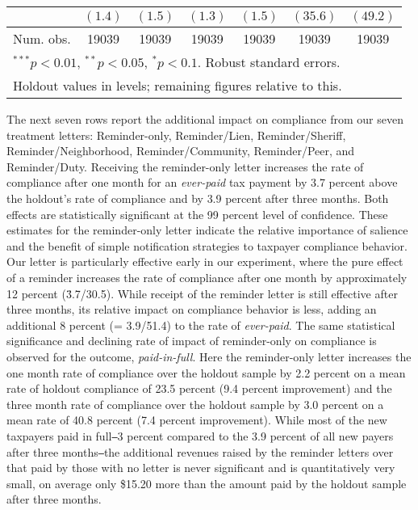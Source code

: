 \documentclass[12pt]{article}
\begin{document}
\begin{table}[htbp]
\begin{center}
\begin{tabular}{l c c c c c c }
             & $(1.4)$      & $(1.5)$      & $(1.3)$      & $(1.5)$      & $(35.6)$      & $(49.2)$      \\
\hline
Num. obs.    & 19039        & 19039        & 19039        & 19039        & 19039         & 19039         \\
\hline
\multicolumn{7}{l}{\scriptsize{$^{***}p<0.01$, $^{**}p<0.05$, $^*p<0.1$. Robust standard errors.}}  \\
\multicolumn{7}{l}{\scriptsize{Holdout values in levels; remaining figures relative to this.}}
\end{tabular}
\label{sh_lin}
\end{center}
\end{table}

The next seven rows report the additional impact on compliance from
our seven treatment letters: Reminder-only, Reminder/Lien,
Reminder/Sheriff, Reminder/Neighborhood, Reminder/Community,
Reminder/Peer, and Reminder/Duty.  Receiving the reminder-only letter
increases the rate of compliance after one month for an
\textit{ever-paid} tax payment by 3.7 percent above the holdout's rate
of compliance and by 3.9 percent after three months.  Both effects are
statistically significant at the 99 percent level of confidence.
These estimates for the reminder-only letter indicate the relative
importance of salience and the benefit of simple notification strategies to taxpayer compliance
behavior.  Our letter is particularly effective early in our
experiment, where the pure effect of a reminder increases the rate of
compliance after one month by approximately 12 percent (\= 3.7/30.5).
While receipt of the reminder letter is still effective after three
months, its relative impact on compliance behavior is less, adding an
additional 8 percent (= 3.9/51.4) to the rate of \textit{ever-paid}.
The same statistical significance and declining rate of impact of reminder-only on
compliance is observed for the outcome, \textit{paid-in-full}.  Here
the reminder-only letter increases the one month rate of compliance
over the holdout sample by 2.2 percent on a mean rate of holdout
compliance of 23.5 percent (9.4 percent improvement) and the three
month rate of compliance over the holdout sample by 3.0 percent on a
mean rate of 40.8 percent (7.4 percent improvement). While most of the new taxpayers paid in full\texttt{--}3 percent
compared to the 3.9 percent of all new payers after three months\texttt{--}the additional revenues raised by the
reminder letters over that paid by those with no letter is never significant and is quantitatively very small,
on average only \$15.20 more than the amount paid by the holdout sample after three months.
\end{document}
